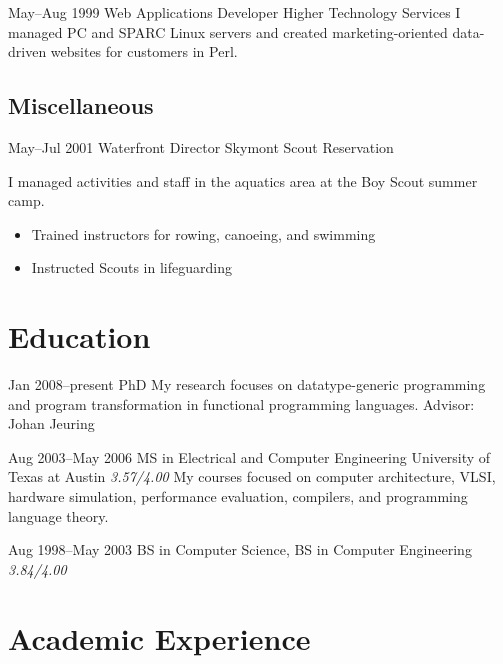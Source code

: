 \documentclass[11pt,a4paper,roman]{moderncv}
\begin{document}
\cventry%
{May--Aug 1999}%
{Web Applications Developer}%
{Higher Technology Services}%
{\chattanooga}%
{}%
{I managed PC and SPARC Linux servers and created marketing-oriented data-driven websites for customers in Perl.}


\subsection{Miscellaneous}

\cventry%
{May--Jul 2001}%
{Waterfront Director}%
{Skymont Scout Reservation}%
{\altamont}%
{}%
{I managed activities and staff in the aquatics area at the Boy Scout summer camp.
\begin{itemize}
\item Trained instructors for rowing, canoeing, and swimming
\item Instructed Scouts in lifeguarding
\end{itemize}}

\newpage

\section{Education}

\cventry%
{Jan 2008--present}%
{PhD}%
{\uu}%
{\utrecht}%
{}%
{My research focuses on datatype-generic programming and program transformation
in functional programming languages.\newline{}%
Advisor: Johan Jeuring}

\cventry%
{Aug 2003--May 2006}%
{MS in Electrical and Computer Engineering}%
{University of Texas at Austin}%
{\austin}%
{\textit{3.57/4.00}}%
{My courses focused on computer architecture, VLSI, hardware simulation,
performance evaluation, compilers, and programming language theory.}

\cventry%
{Aug 1998--May 2003}%
{BS in Computer Science, BS in Computer Engineering}%
{\wustl}%
{\stlouis}%
{\textit{3.84/4.00}}%
{}


\section{Academic Experience}
\end{document}
